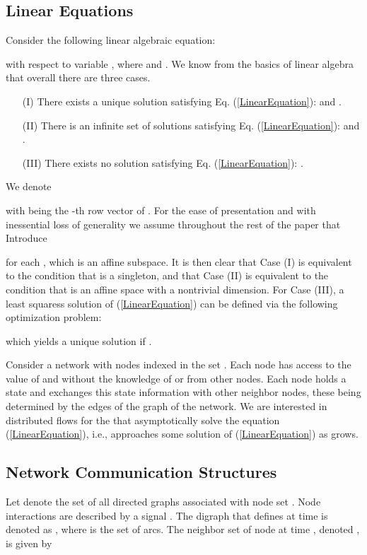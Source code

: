 \documentclass[a4paper, 11pt]{article}
\begin{document}
\subsection{Linear Equations}
Consider the following  linear algebraic equation:

with respect to variable , where  and . We know from the basics of linear algebra that overall there are three cases.

\begin{itemize}
\item[(I)] There exists a unique solution satisfying  Eq. (\ref{LinearEquation}):  and .

\item[(II)] There is an infinite set of  solutions  satisfying  Eq. (\ref{LinearEquation}):  and .


\item[(III)] There exists no solution   satisfying  Eq. (\ref{LinearEquation}): .
\end{itemize}

We denote

with  being the -th row vector of . For the ease of presentation and with inessential loss of generality we assume throughout the rest of the paper that
 Introduce

for each , which is an affine subspace.  It is then clear that Case (I) is equivalent to the condition that  is a singleton, and that Case (II) is equivalent to the condition  that  is an affine space with a nontrivial dimension. For Case (III), a least squaress solution of (\ref{LinearEquation}) can be defined via the following  optimization problem:

which yields a unique solution  if .


Consider a network with nodes  indexed in the set .  Each node  has access to the value of  and  without the knowledge of  or  from other nodes. Each node   holds a state  and exchanges this state information with other neighbor nodes, these being determined by the edges of the graph of the network.
We are interested in distributed flows for the  that asymptotically solve the equation (\ref{LinearEquation}), i.e.,  approaches some solution of  (\ref{LinearEquation}) as  grows.
\subsection{Network Communication Structures}
Let  denote the set of all directed graphs associated with node set . Node interactions are described by a  signal .
The digraph that  defines at time  is denoted as , where  is the set of arcs. The neighbor set of node  at time , denoted , is given by
\end{document}
